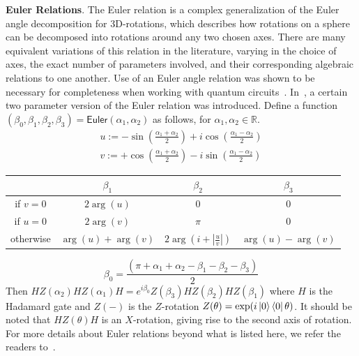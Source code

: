 \vspace{1em}
\noindent
\textbf{Euler Relations}.
%
The Euler relation is a complex generalization of the Euler angle decomposition for 3D-rotations, which describes how rotations on a sphere can be decomposed into rotations around any two chosen axes.
There are many equivalent variations of this relation in the literature, varying in the choice of axes, the exact number of parameters involved, and their corresponding algebraic relations to one another.
Use of an Euler angle relation was shown to be necessary for completeness when working with quantum circuits~\cite{Clement2024Minimal,Vilmart2021}.
In~\cite{Delorme2025}, a certain two parameter version of the Euler relation was introduced.
Define a function $( \beta_0, \beta_1, \beta_2, \beta_3 ) = \mathsf{Euler}( \alpha_1, \alpha_2 )$ as follows, for $\alpha_1, \alpha_2 \in \mathbb{R}$.
\begin{equation*}
    \begin{array}{l}
      u := -\sin\left(\frac{\alpha_1+\alpha_2}{2}\right)+i\cos\left(\frac{\alpha_1-\alpha_2}{2}\right)\\
      v := +\cos\left(\frac{\alpha_1+\alpha_2}{2}\right)-i\sin\left(\frac{\alpha_1-\alpha_2}{2}\right)
    \end{array}
\end{equation*}
\begin{center}
  \begin{tabular}{c|c|c|c}
    & $\beta_1$ & $\beta_2$ & $\beta_3$ \\
    \hline
    if $v=0$ & $2\arg(u)$ & $0$ & $0$\\
    \hline
    if $u=0$ & $2\arg(v)$ & $\pi$ & $0$\\
    \hline
    otherwise \hspace{0.2em}&\hspace{0.2em} $\arg(u)+\arg(v)$ \hspace{0.2em}&\hspace{0.2em} $2\arg\left(i+\left\lvert\tfrac{u}{v}\right\rvert\right)$ \hspace{0.2em}&\hspace{0.2em} $\arg(u)-\arg(v)$
  \end{tabular}
\end{center}
\begin{equation*}
    \beta_0 = \frac{(\pi+\alpha_1+\alpha_2-\beta_1-\beta_2-\beta_3)}{2}
\end{equation*}
Then $H Z( \alpha_2 ) H Z( \alpha_1 ) H = e^{i\beta_0} Z( \beta_3 ) H Z( \beta_2 ) H Z( \beta_1 )$ where $H$ is the Hadamard gate and $Z( - )$ is the $Z$-rotation $Z( \theta ) = \exp( i \ket{0} \bra{0} \theta )$.
It should be noted that $H Z( \theta ) H$ is an $X$-rotation, giving rise to the second axis of rotation.
For more details about Euler relations beyond what is listed here, we refer the readers to~\cite{Vilmart2021,Clement2024Minimal,Clement2024Extensions,Delorme2025}.

